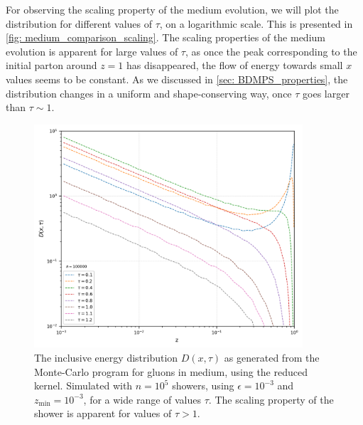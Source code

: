 \documentclass[main.tex]{subfiles}
\begin{document}
For observing the scaling property of the medium evolution, we will plot the distribution for different values of \(\tau\), on a logarithmic scale. This is presented in \autoref{fig: medium_comparison_scaling}. The scaling properties of the medium evolution is apparent for large values of \(\tau\), as once the peak corresponding to the initial parton around \(z=1\) has disappeared, the flow of energy towards small \(x\) values seems to be constant. As we discussed in \autoref{sec: BDMPS_properties}, the distribution changes in a uniform and shape-conserving way, once \(\tau\) goes larger than \(\tau \sim 1\). 
\begin{figure}[htb]
    \centering
    \includegraphics[width=10cm]{pictures/plots/distributions/medium/medium_scaling_100k.png}
    \caption{The inclusive energy distribution \(D(x,\tau)\) as generated from the Monte-Carlo program for gluons in medium, using the reduced kernel. Simulated with \(n=10^5\) showers, using \(\epsilon=10^{-3}\) and \(z_{\text{min}} = 10^{-3}\), for a wide range of values \(\tau\). The scaling property of the shower is apparent for values of \(\tau > 1\).}
    \label{fig: medium_comparison_scaling}
\end{figure}
\end{document}
